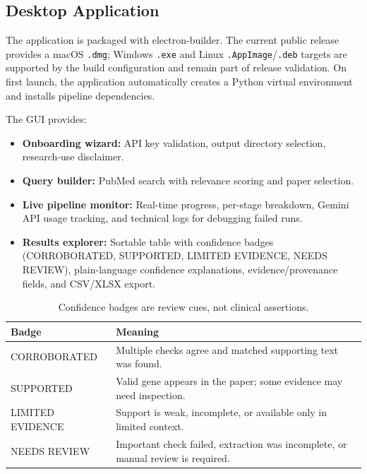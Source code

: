 \subsection{Desktop Application}
\label{subsec:desktop}

The application is packaged with electron-builder. The current public release provides a macOS \texttt{.dmg}; Windows \texttt{.exe} and Linux \texttt{.AppImage}/\texttt{.deb} targets are supported by the build configuration and remain part of release validation. On first launch, the application automatically creates a Python virtual environment and installs pipeline dependencies.

The GUI provides:
\begin{itemize}[itemsep=1pt]
    \item \textbf{Onboarding wizard:} API key validation, output directory selection, research-use disclaimer.
    \item \textbf{Query builder:} PubMed search with relevance scoring and paper selection.
    \item \textbf{Live pipeline monitor:} Real-time progress, per-stage breakdown, Gemini API usage tracking, and technical logs for debugging failed runs.
    \item \textbf{Results explorer:} Sortable table with confidence badges (CORROBORATED, SUPPORTED, LIMITED EVIDENCE, NEEDS REVIEW), plain-language confidence explanations, evidence/provenance fields, and CSV/XLSX export.
\end{itemize}

\begin{table}[t]
\centering
\footnotesize
\setlength{\tabcolsep}{3pt}
\renewcommand{\arraystretch}{1.05}
\begin{tabularx}{\columnwidth}{>{\raggedright\arraybackslash}p{2.35cm} X}
\toprule
\textbf{Badge} & \textbf{Meaning} \\
\midrule
\textsc{CORROBORATED} & Multiple checks agree and matched supporting text was found. \\
\textsc{SUPPORTED} & Valid gene appears in the paper; some evidence may need inspection. \\
\textsc{LIMITED EVIDENCE} & Support is weak, incomplete, or available only in limited context. \\
\textsc{NEEDS REVIEW} & Important check failed, extraction was incomplete, or manual review is required. \\
\bottomrule
\end{tabularx}
\caption{Confidence badges are review cues, not clinical assertions.}
\label{tab:confidence_badges}
\end{table}

